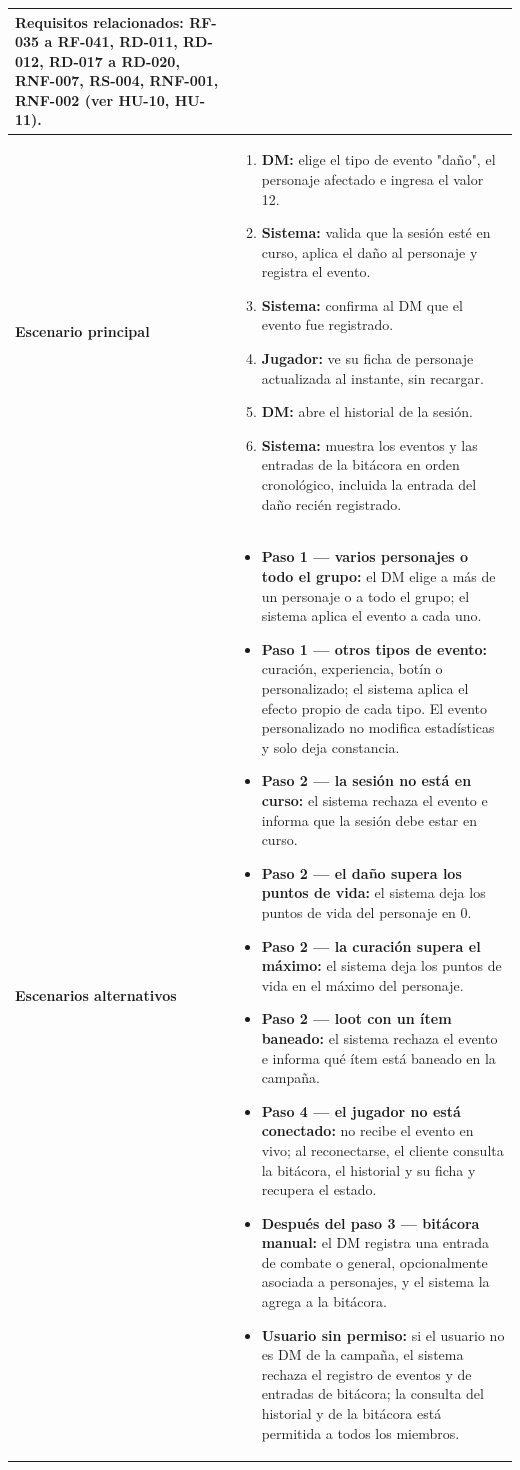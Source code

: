 {\begin{longtable}{|>{\raggedright\arraybackslash\bfseries}p{3.2cm}|>{\raggedright\arraybackslash}p{11.9cm}|}
Requisitos relacionados: RF-035 a RF-041, RD-011, RD-012, RD-017 a RD-020, RNF-007, RS-004, RNF-001, RNF-002 (ver HU-10, HU-11). \\ \hline
Escenario principal & \begin{enumerate}[itemsep=2pt,topsep=2pt]
\item \textbf{DM:} elige el tipo de evento "daño", el personaje afectado e ingresa el valor 12.
\item \textbf{Sistema:} valida que la sesión esté en curso, aplica el daño al personaje y registra el evento.
\item \textbf{Sistema:} confirma al DM que el evento fue registrado.
\item \textbf{Jugador:} ve su ficha de personaje actualizada al instante, sin recargar.
\item \textbf{DM:} abre el historial de la sesión.
\item \textbf{Sistema:} muestra los eventos y las entradas de la bitácora en orden cronológico, incluida la entrada del daño recién registrado.
\end{enumerate} \\ \hline
Escenarios alternativos & \begin{itemize}[itemsep=2pt,topsep=2pt]
\item \textbf{Paso 1 — varios personajes o todo el grupo:} el DM elige a más de un personaje o a todo el grupo; el sistema aplica el evento a cada uno.
\item \textbf{Paso 1 — otros tipos de evento:} curación, experiencia, botín o personalizado; el sistema aplica el efecto propio de cada tipo. El evento personalizado no modifica estadísticas y solo deja constancia.
\item \textbf{Paso 2 — la sesión no está en curso:} el sistema rechaza el evento e informa que la sesión debe estar en curso.
\item \textbf{Paso 2 — el daño supera los puntos de vida:} el sistema deja los puntos de vida del personaje en 0.
\item \textbf{Paso 2 — la curación supera el máximo:} el sistema deja los puntos de vida en el máximo del personaje.
\item \textbf{Paso 2 — loot con un ítem baneado:} el sistema rechaza el evento e informa qué ítem está baneado en la campaña.
\item \textbf{Paso 4 — el jugador no está conectado:} no recibe el evento en vivo; al reconectarse, el cliente consulta la bitácora, el historial y su ficha y recupera el estado.
\item \textbf{Después del paso 3 — bitácora manual:} el DM registra una entrada de combate o general, opcionalmente asociada a personajes, y el sistema la agrega a la bitácora.
\item \textbf{Usuario sin permiso:} si el usuario no es DM de la campaña, el sistema rechaza el registro de eventos y de entradas de bitácora; la consulta del historial y de la bitácora está permitida a todos los miembros.
\end{itemize} \\ \hline
\end{longtable}}
